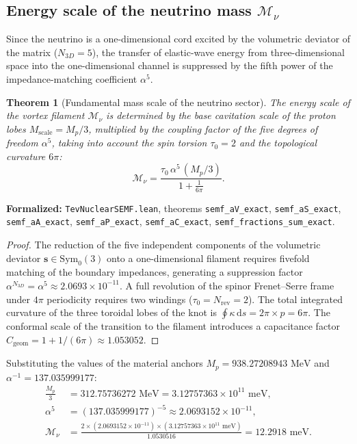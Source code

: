 \documentclass[11pt,a4paper]{article}
\newtheorem{theorem}{Theorem}
\theoremstyle{definition}
\theoremstyle{remark}
\begin{document}
\subsection{Energy scale of the neutrino mass $\mathcal{M}_\nu$}
	
Since the neutrino is a one-dimensional cord excited by the volumetric deviator of the matrix ($N_{3D} = 5$), the transfer of elastic-wave energy from three-dimensional space into the one-dimensional channel is suppressed by the fifth power of the impedance-matching coefficient $\alpha^5$.
	
\begin{theorem}[Fundamental mass scale of the neutrino sector]
\label{thm:neutrino_scale_derivation}
The energy scale of the vortex filament $\mathcal{M}_\nu$ is determined by the base cavitation scale of the proton lobes $M_{\mathrm{scale}} = M_p / 3$, multiplied by the coupling factor of the five degrees of freedom $\alpha^5$, taking into account the spin torsion $\tau_0 = 2$ and the topological curvature $6\pi$:
\begin{equation}
\mathcal{M}_\nu = \frac{\tau_0 \, \alpha^5 \, (M_p / 3)}{1 + \frac{1}{6\pi}}.
\label{eq:neutrino_scale_formula}
\end{equation}
\end{theorem}

\noindent\small\textbf{Formalized:} \texttt{TevNuclearSEMF.lean}, theorems \texttt{semf_aV_exact}, \texttt{semf_aS_exact}, \texttt{semf_aA_exact}, \texttt{semf_aP_exact}, \texttt{semf_aC_exact}, \texttt{semf_fractions_sum_exact}.


	
\begin{proof}
	The reduction of the five independent components of the volumetric deviator $\mathbf{s} \in \mathrm{Sym}_0(3)$ onto a one-dimensional filament requires fivefold matching of the boundary impedances, generating a suppression factor $\alpha^{N_{3D}} = \alpha^5 \approx 2.0693 \times 10^{-11}$. A full revolution of the spinor Frenet--Serre frame under $4\pi$ periodicity requires two windings ($\tau_0 = N_{\mathrm{rev}} = 2$). The total integrated curvature of the three toroidal lobes of the knot is $\oint \kappa \, \mathrm{d}s = 2\pi \times p = 6\pi$. The conformal scale of the transition to the filament introduces a capacitance factor $C_{\mathrm{geom}} = 1 + 1/(6\pi) \approx 1.053052$.
\end{proof}
	
Substituting the values of the material anchors $M_p = 938.27208943\text{ MeV}$ and $\alpha^{-1} = 137.035999177$:
\begin{align}
	\frac{M_p}{3} &= 312.75736272\text{ MeV} = 3.12757363 \times 10^{11}\text{ meV}, \\
	\alpha^5 &= (137.035999177)^{-5} \approx 2.0693152 \times 10^{-11}, \\
	\mathcal{M}_\nu &= \frac{2 \times (2.0693152 \times 10^{-11}) \times (3.12757363 \times 10^{11}\text{ meV})}{1.0530516} = 12.2918\text{ meV}.
\end{align}
	
\end{document}
